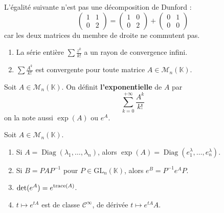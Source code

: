   \begin{cexample}
    L'égalité suivante n'est pas une décomposition de Dunford :
    \[ \begin{pmatrix} 1 & 1 \\ 0 & 2 \end{pmatrix} = \begin{pmatrix} 1 & 0 \\ 0 & 2 \end{pmatrix} + \begin{pmatrix} 0 & 1 \\ 0 & 0 \end{pmatrix} \]
    car les deux matrices du membre de droite ne commutent pas.
  \end{cexample}


  \begin{lemma}
    \begin{enumerate}[label={\bfseries(\roman*)}]
      \item La série entière $\sum \frac{z^k}{k!}$ a un rayon de convergence infini.
      \item $\sum \frac{A^k}{k!}$ est convergente pour toute matrice $A \in \mathcal{M}_n(\mathbb{K})$.
    \end{enumerate}
  \end{lemma}

  \begin{definition}
    Soit $A \in \mathcal{M}_n(\mathbb{K})$. On définit \textbf{l'exponentielle} de $A$ par
    \[ \sum_{k=0}^{+\infty} \frac{A^k}{k!} \]
    on la note aussi $\exp(A)$ ou $e^A$.
  \end{definition}

  \begin{theorem}
    Soit $A \in \mathcal{M}_n(\mathbb{K})$.
    \begin{enumerate}[label={\bfseries(\roman*)}]
      \item Si $A = \operatorname{Diag}(\lambda_1, \dots, \lambda_n)$, alors $\exp(A) = \operatorname{Diag}(e^\lambda_1, \dots, e^\lambda_n)$.
      \item Si $B = PAP^{-1}$ pour $P \in \mathrm{GL}_n(\mathbb{K})$, alors $e^B = P^{-1} e^A P$.
      \item $\det(e^A) = e^{\operatorname{trace}(A)}$.
      \item $t \mapsto e^{tA}$ est de classe $\mathcal{C}^\infty$, de dérivée $t \mapsto e^{tA}A$.
    \end{enumerate}
  \end{theorem}

